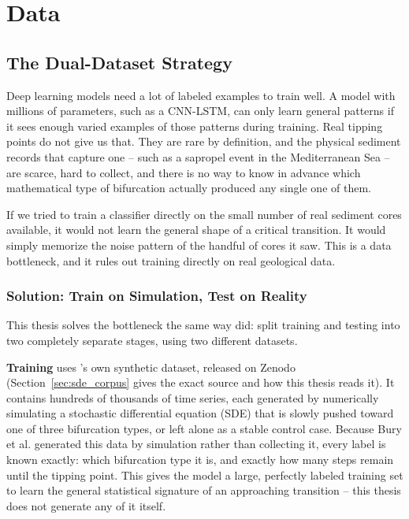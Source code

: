 \chapter{Data}
\label{ch:data}

\section{The Dual-Dataset Strategy}
\label{sec:dual_dataset}

Deep learning models need a lot of labeled examples to train well. A model with millions of parameters, such as a CNN-LSTM, can only learn general patterns if it sees enough varied examples of those patterns during training. Real tipping points do not give us that. They are rare by definition, and the physical sediment records that capture one -- such as a sapropel event in the Mediterranean Sea -- are scarce, hard to collect, and there is no way to know in advance which mathematical type of bifurcation actually produced any single one of them.

If we tried to train a classifier directly on the small number of real sediment cores available, it would not learn the general shape of a critical transition. It would simply memorize the noise pattern of the handful of cores it saw. This is a data bottleneck, and it rules out training directly on real geological data.

\subsection{Solution: Train on Simulation, Test on Reality}

This thesis solves the bottleneck the same way \citet{bury2021} did: split training and testing into two completely separate stages, using two different datasets.

\textbf{Training} uses \citet{bury2021}'s own synthetic dataset, released on Zenodo (Section~\ref{sec:sde_corpus} gives the exact source and how this thesis reads it). It contains hundreds of thousands of time series, each generated by numerically simulating a stochastic differential equation (SDE) that is slowly pushed toward one of three bifurcation types, or left alone as a stable control case. Because Bury et al. generated this data by simulation rather than collecting it, every label is known exactly: which bifurcation type it is, and exactly how many steps remain until the tipping point. This gives the model a large, perfectly labeled training set to learn the general statistical signature of an approaching transition -- this thesis does not generate any of it itself.

